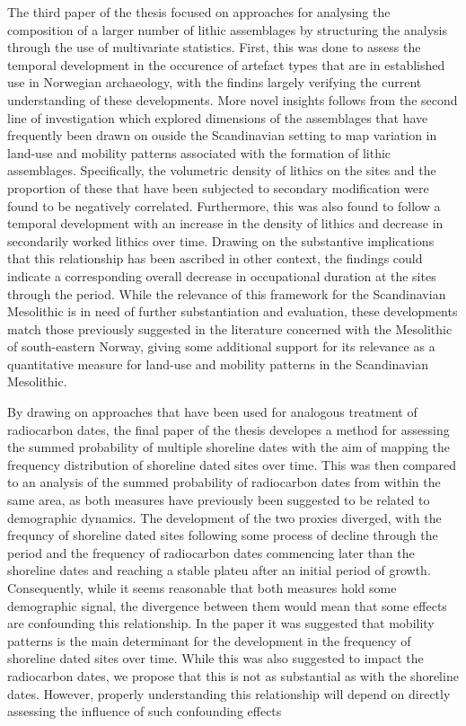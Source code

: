 The third paper of the thesis focused on approaches for analysing the composition of a larger number of lithic assemblages by structuring the analysis through the use of multivariate statistics. First, this was done to assess the temporal development in the occurence of artefact types that are in established use in Norwegian archaeology, with the findins largely verifying the current understanding of these developments. More novel insights follows from the second line of investigation which explored dimensions of the assemblages that have frequently been drawn on ouside the Scandinavian setting to map variation in land-use and mobility patterns associated with the formation of lithic assemblages. Specifically, the volumetric density of lithics on the sites and the proportion of these that have been subjected to secondary modification were found to be negatively correlated. Furthermore, this was also found to follow a temporal development with an increase in the density of lithics and decrease in secondarily worked lithics over time. Drawing on the substantive implications that this relationship has been ascribed in other context, the findings could indicate a corresponding overall decrease in occupational duration at the sites through the period. While the relevance of this framework for the Scandinavian Mesolithic is in need of further substantiation and evaluation, these developments match those previously suggested in the literature concerned with the Mesolithic of south-eastern Norway, giving some additional support for its relevance as a quantitative measure for land-use and mobility patterns in the Scandinavian Mesolithic.  

By drawing on approaches that have been used for analogous treatment of radiocarbon dates, the final paper of the thesis developes a method for assessing the summed probability of multiple shoreline dates with the aim of mapping the frequency distribution of shoreline dated sites over time. This was then compared to an analysis of the summed probability of radiocarbon dates from within the same area, as both measures have previously been suggested to be related to demographic dynamics. The development of the two proxies diverged, with the frequncy of shoreline dated sites following some process of decline through the period and the frequency of radiocarbon dates commencing later than the shoreline dates and reaching a stable plateu after an initial period of growth. Consequently, while it seems reasonable that both measures hold some demographic signal, the divergence between them would mean that some effects are confounding this relationship. In the paper it was suggested that mobility patterns is the main determinant for the development in the frequency of shoreline dated sites over time. While this was also suggested to impact the radiocarbon dates, we propose that this is not as substantial as with the shoreline dates. However, properly understanding this relationship will depend on directly assessing the influence of such confounding effects


